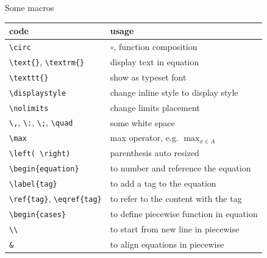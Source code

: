 \documentclass [xcolor=svgnames, t] {beamer}
\begin{document}
\begin{frame}{Some macros}
    \vspace*{-2em}
    \begin{center}
        \begin{tabular}{ll}\\ \hline
            code & usage \\ \hline
            \texttt{\textbackslash circ} & $\circ$, function composition \\
            \texttt{\textbackslash text\{\}}, \texttt{\textbackslash textrm\{\}} & display text in equation\\
            \texttt{\textbackslash texttt\{\}} & show as typeset font\\
            \texttt{\textbackslash displaystyle} & change inline style to display style \\
            \texttt{\textbackslash nolimits} & change limits placement \\
            \texttt{\textbackslash,}, \texttt{\textbackslash:}, \texttt{\textbackslash;}, \texttt{\textbackslash quad} & some white space \\ 
            \texttt{\textbackslash max} & max operator, e.g. $\max_{x\in A}$ \\
            \texttt{\textbackslash left( \textbackslash right)} & parenthesis auto 
            resized\\ 
            \texttt{\textbackslash begin\{equation\}} & to number and reference the equation\\
            \texttt{\textbackslash label\{tag\}} & to add a tag to the equation\\
            \texttt{\textbackslash ref\{tag\}}, \texttt{\textbackslash eqref\{tag\}} & to refer to the content with the tag\\
            \texttt{\textbackslash begin\{cases\}} & to define piecewise function in equation\\
            \texttt{\textbackslash\textbackslash} & to start from new line in piecewise \\
            \texttt{\&} & to align equations in piecewise \\
            \hline
        \end{tabular}
    \end{center}
\end{frame}
\end{document}
